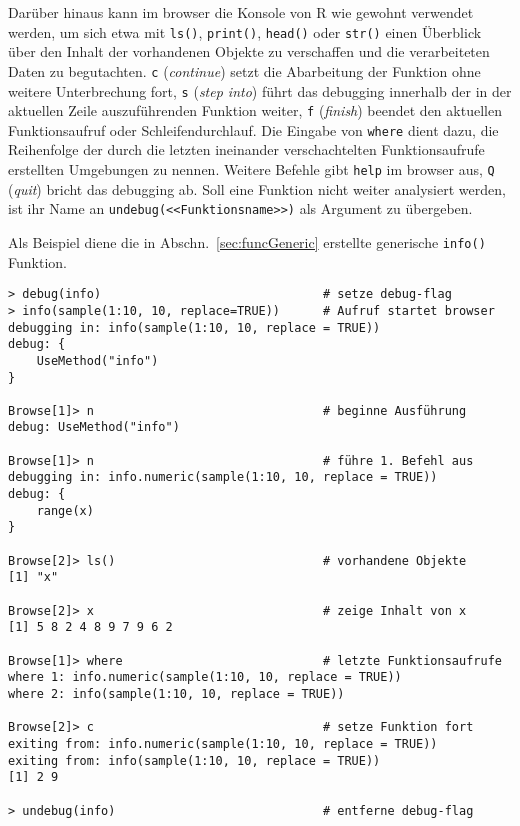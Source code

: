 Darüber hinaus kann im browser die Konsole von R wie gewohnt verwendet werden, um sich etwa mit \lstinline!ls()!, \lstinline!print()!, \lstinline!head()! oder \lstinline!str()! einen Überblick über den Inhalt der vorhandenen Objekte zu verschaffen und die verarbeiteten Daten zu begutachten. \lstinline!c! (\emph{continue}) setzt die Abarbeitung der Funktion ohne weitere Unterbrechung fort, \lstinline!s! (\emph{step into}) führt das debugging innerhalb der in der aktuellen Zeile auszuführenden Funktion weiter, \lstinline!f! (\emph{finish}) beendet den aktuellen Funktionsaufruf oder Schleifendurchlauf. Die Eingabe von \lstinline!where! dient dazu, die Reihenfolge der durch die letzten ineinander verschachtelten Funktionsaufrufe erstellten Umgebungen zu nennen. Weitere Befehle gibt \lstinline!help! im browser aus, \lstinline!Q! (\emph{quit}) bricht das debugging ab. Soll eine Funktion nicht weiter analysiert werden, ist ihr Name an  \lstinline!undebug(<<Funktionsname>>)! als Argument zu übergeben.


Als Beispiel diene die in Abschn.\ \ref{sec:funcGeneric} erstellte generische \lstinline!info()! Funktion.
\begin{lstlisting}
> debug(info)                               # setze debug-flag
> info(sample(1:10, 10, replace=TRUE))      # Aufruf startet browser
debugging in: info(sample(1:10, 10, replace = TRUE))
debug: {
    UseMethod("info")
}

Browse[1]> n                                # beginne Ausführung
debug: UseMethod("info")

Browse[1]> n                                # führe 1. Befehl aus
debugging in: info.numeric(sample(1:10, 10, replace = TRUE))
debug: {
    range(x)
}

Browse[2]> ls()                             # vorhandene Objekte
[1] "x"

Browse[2]> x                                # zeige Inhalt von x
[1] 5 8 2 4 8 9 7 9 6 2

Browse[1]> where                            # letzte Funktionsaufrufe
where 1: info.numeric(sample(1:10, 10, replace = TRUE))
where 2: info(sample(1:10, 10, replace = TRUE))

Browse[2]> c                                # setze Funktion fort
exiting from: info.numeric(sample(1:10, 10, replace = TRUE))
exiting from: info(sample(1:10, 10, replace = TRUE))
[1] 2 9

> undebug(info)                             # entferne debug-flag
\end{lstlisting}

